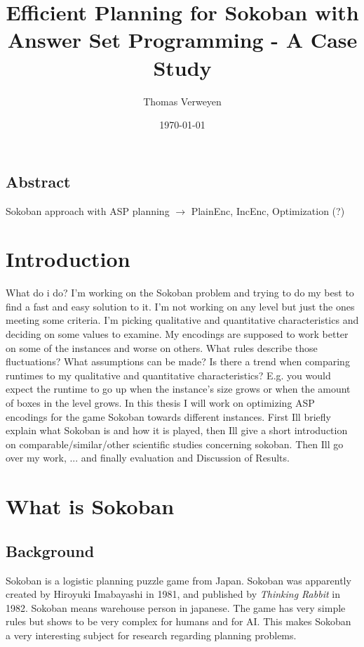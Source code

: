 \documentclass{report}
\title{Efficient Planning for Sokoban with Answer Set Programming - A Case Study}
\author{Thomas Verweyen}
\date{\today}
\begin{document}
\maketitle
\renewcommand*\contentsname{Summary}
\tableofcontents
\section*{Abstract}
Sokoban approach with ASP planning $\rightarrow$ PlainEnc, IncEnc, Optimization (?)
\chapter{Introduction}
What do i do? I'm working on the Sokoban problem and trying to do my best to find a fast and easy solution to it. I'm not working on any level but just the ones meeting some criteria. I'm picking qualitative and quantitative characteristics and deciding on some values to examine. My encodings are supposed to work better on some of the instances and worse on others. What rules describe those fluctuations? What assumptions can be made? Is there a trend when comparing runtimes to my qualitative and quantitative characteristics? E.g. you would expect the runtime to go up when the instance's size grows or when the amount of boxes in the level grows.
In this thesis I will work on optimizing ASP encodings for the game Sokoban towards different instances. First Ill briefly explain what Sokoban is and how it is played, then Ill give a short introduction on comparable/similar/other scientific studies concerning sokoban. Then Ill go over my work, ... and finally evaluation and Discussion of Results.
\chapter{What is Sokoban}
\section{Background}
Sokoban is a logistic planning puzzle game from Japan. Sokoban was apparently created by Hiroyuki Imabayashi in 1981, and published by \textit{Thinking Rabbit} in 1982. Sokoban means warehouse person in japanese. The game has very simple rules but shows to be very complex for humans and for AI. This makes Sokoban a very interesting subject for research regarding planning problems.
\end{document}
